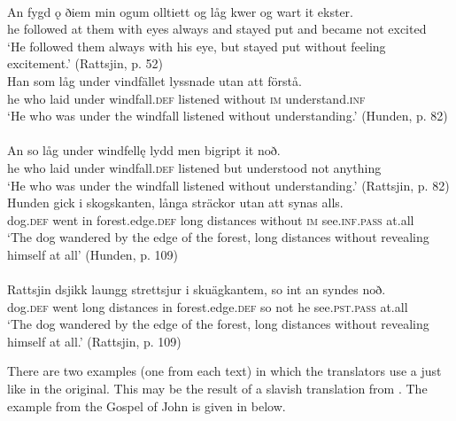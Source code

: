 \documentclass[output=paper]{langscibook}
\begin{document}
\ex {}\label{ex:kalm:23b}\\ 
\gll An fygd ǫ ðiem min ogum olltiett og låg kwer og wart it ekster.\\
he followed at them with eyes always and stayed put and became not excited\\
\glt ‘He followed them always with his eye, but stayed put without feeling excitement.’ (Rattsjin, p. 52)
\z 
\ex
\label{ex:kalm:24}
\ea {}\label{ex:kalm:24a}\\
\gll Han som låg under vindfället lyssnade utan att förstå.\\
he who laid under windfall.\textsc{def} listened without \textsc{im} understand.\textsc{inf}\\
\glt ‘He who was under the windfall listened without understanding.’ (Hunden, p. 82)\\
\ex {}\label{ex:kalm:24b}\\ 
\gll An so låg under windfellę lydd men bigript it noð.\\
he who laid under windfall.\textsc{def} listened but understood not anything\\
\glt ‘He who was under the windfall listened without understanding.’ (Rattsjin, p. 82)
\z
\ex
\label{ex:kalm:25}
\ea {}\label{ex:kalm:25a}\\
\gll Hunden gick i skogskanten, långa sträckor utan att synas alls.\\
dog.\textsc{def} went in forest.edge.\textsc{def} long distances without \textsc{im} see.\textsc{inf.pass} at.all\\
\glt ‘The dog wandered by the edge of the forest, long distances without revealing himself at all’ (Hunden, p. 109)\\
\ex {}\label{ex:kalm:25b}\\ 
\gll Rattsjin dsjikk laungg strettsjur i skuägkantem, so int an syndes noð.\\
dog.\textsc{def} went long distances in forest.edge.\textsc{def} so not he see.\textsc{pst.pass} at.all\\
\glt ‘The dog wandered by the edge of the forest, long distances without revealing himself at all.’ (Rattsjin, p. 109)
\z 
\z 


There are two examples (one from each text) in which the translators use a  just like in the  original. This may be the result of a slavish translation from . The example from the Gospel of John is given in  below.\pagebreak
\end{document}
